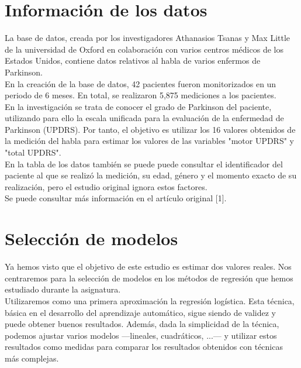 \newpage

\section{Información de los datos}

La base de datos, creada por los investigadores Athanasios Tsanas y Max Little de la universidad de Oxford en colaboración con varios centros médicos de los Estados Unidos, contiene datos relativos al habla de varios enfermos de Parkinson.\\

En la creación de la base de datos, 42 pacientes fueron monitorizados en un periodo de 6 meses. En total, se realizaron 5,875 mediciones a los pacientes.\\

En la investigación se trata de conocer el grado de Parkinson del paciente, utilizando para ello la escala unificada para la evaluación de la enfermedad de Parkinson (UPDRS). Por tanto, el objetivo es utilizar los 16 valores obtenidos de la medición del habla para estimar los valores de las variables "motor UPDRS" y "total UPDRS".\\

En la tabla de los datos también se puede puede consultar el identificador del paciente al que se realizó la medición, su edad, género y el momento exacto de su realización, pero el estudio original ignora estos factores.\\

Se puede consultar más información en el artículo original [1].

\newpage

\section{Selección de modelos}

Ya hemos visto que el objetivo de este estudio es estimar dos valores reales. Nos centraremos para la selección de modelos en los métodos de regresión que hemos estudiado durante la asignatura.\\

Utilizaremos como una primera aproximación la regresión logística. Esta técnica, básica en el desarrollo del aprendizaje automático, sigue siendo de validez y puede obtener buenos resultados. Además, dada la simplicidad de la técnica, podemos ajustar varios modelos ---lineales, cuadráticos, ...--- y utilizar estos resultados como medidas para comparar los resultados obtenidos con técnicas más complejas.\\

